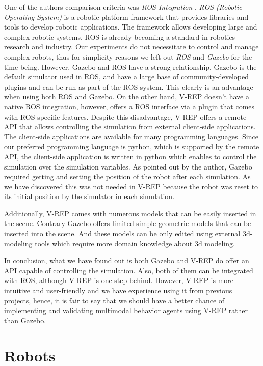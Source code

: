 \documentclass[format=acmsmall, review=false, screen=true]{acmart}
\begin{document}
One of the authors comparison criteria was \emph{ROS Integration} \cite{quigley2009ros}. \emph{ROS (Robotic Operating System)} is a robotic platform framework that provides libraries and tools to develop robotic applications. The framework allows developing large and complex robotic systems. ROS is already becoming a standard in robotics research and industry. Our experiments do not necessitate to control and manage complex robots, thus for simplicity reasons we left out \emph{ROS} and \emph{Gazebo} for the time being. However, Gazebo and ROS have a strong relationship. Gazebo is the default simulator used in ROS, and have a large base of community-developed plugins and can be run as part of the ROS system. This clearly is an advantage when using both ROS and Gazebo. On the other hand, V-REP doesn't have a native ROS integration, however, offers a  ROS interface via a plugin that comes with ROS specific features. Despite this disadvantage, V-REP offers a remote API that allows controlling the simulation from external client-side applications. The client-side applications are available for many programming languages. Since our preferred programming language is python, which is supported by the remote API, the client-side application is written in python which enables to control the simulation over the simulation variables. As pointed out by the author, Gazebo required getting and setting the position of the robot after each simulation. As we have discovered this was not needed in V-REP because the robot was reset to its initial position by the simulator in each simulation.

Additionally, V-REP comes with numerous models that can be easily inserted in the scene. Contrary Gazebo offers limited simple geometric models that can be inserted into the scene. And these models can be only edited using external 3d-modeling tools which require more domain knowledge about 3d modeling.

In conclusion, what we have found out is both Gazebo and V-REP do offer an API capable of controlling the simulation. Also, both of them can be integrated with ROS, although V-REP is one step behind. However, V-REP is more intuitive and user-friendly and we have experience using it from previous projects, hence, it is fair to say that we should have a better chance of implementing and validating multimodal behavior agents using V-REP rather than Gazebo.

\section{Robots}
\end{document}
